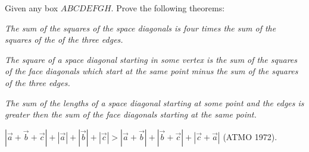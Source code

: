 Given any box $ABCDEFGH$. Prove the following theorems:

\emph{The sum of the squares of the space diagonals is four times the sum of the squares of the of the three edges.}

\emph{The square of a space diagonal starting in some vertex is the sum of the squares of the face diagonals which start at the same point minus the sum of the squares of the three edges.}

\emph{The sum of the lengths of a space diagonal starting at some point and the edges is greater then the sum of the face diagonals starting at the same point.}

$|\vec a + \vec b + \vec c| + |\vec a| + |\vec b| + |\vec c| > |\vec a + \vec b| + |\vec b + \vec c| + |\vec c + \vec a|$ (ATMO 1972).
